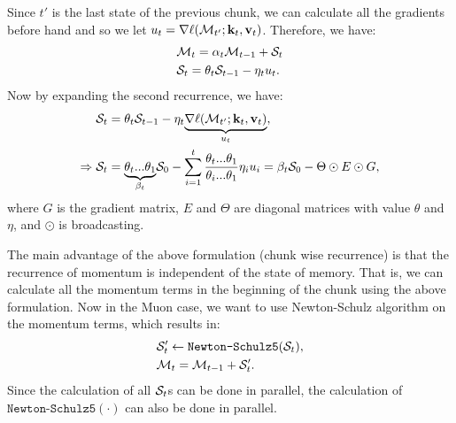 Since $t'$ is the last state of the previous chunk, we can calculate all the gradients before hand and so we let $u_t = \nabla \ell(\mathcal{M}_{t'}; \mathbf{k}_t, \mathbf{v}_t)$. Therefore, we have:
\begin{align}
    &\mathcal{M}_t = \alpha_t \mathcal{M}_{t-1} + \mathcal{S}_t \\
    &\mathcal{S}_t = \theta_t \mathcal{S}_{t-1} - \eta_t u_t.
\end{align}
Now by expanding the second recurrence, we have:
\textbf{\begin{align}
    \mathcal{S}_t &= \theta_t \mathcal{S}_{t-1} - \eta_t \underset{u_t}{\underbrace{\nabla \ell(\mathcal{M}_{t'}; \mathbf{k}_t, \mathbf{v}_t)}}, \\
    \Rightarrow \mathcal{S}_t &= \underset{\beta_t}{\underbrace{\theta_t ... \theta_1}} \mathcal{S}_0 - \sum_{i = 1}^{t} \frac{\theta_t ... \theta_1}{\theta_i ... \theta_1} \eta_i u_i = \beta_t \mathcal{S}_0 - \Theta \odot E \odot G, 
\end{align}}
where $G$ is the gradient matrix, $E$ and $\Theta$ are diagonal matrices with value $\theta$ and $\eta$, and $\odot$ is broadcasting. 

The main advantage of the above formulation (chunk wise recurrence) is that the recurrence of momentum is independent of the state of memory. That is, we can calculate all the momentum terms in the beginning of the chunk using the above formulation. Now in the Muon case, we want to use Newton-Schulz algorithm on the momentum terms, which results in:
\begin{align}
    &\mathcal{S}'_t \leftarrow \texttt{Newton-Schulz5}(\mathcal{S}_t), \\
    &\mathcal{M}_t = \mathcal{M}_{t-1} + \mathcal{S}'_t.
\end{align}
Since the calculation of all $\mathcal{S}_t$s can be done in parallel, the calculation of $\texttt{Newton-Schulz5}(\cdot)$ can also be done in parallel. 














